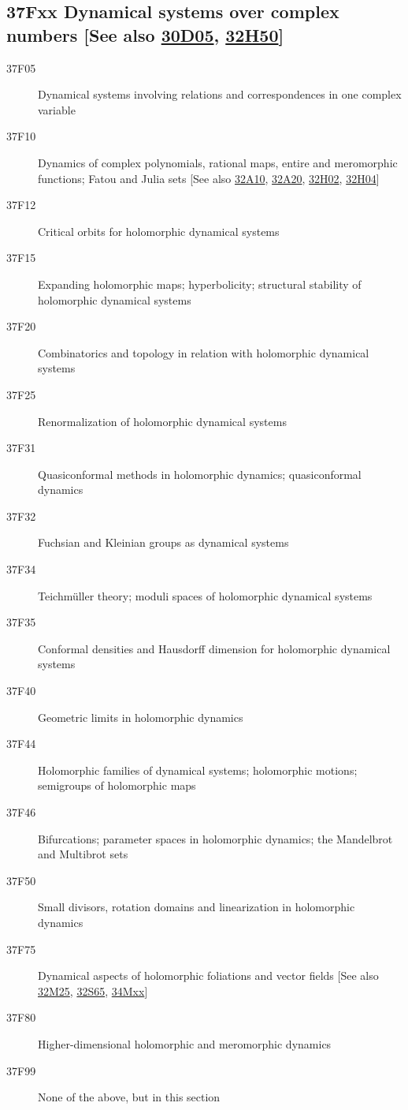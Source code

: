 \subsection*{37Fxx  Dynamical systems over complex numbers [See also \hyperref[30D05]{30D05}, \hyperref[32H50]{32H50}] }\label{37Fxx}
\begin{description} 
\item [37F05]\label{37F05} Dynamical systems involving relations and correspondences in one complex variable 
\item [37F10]\label{37F10}  Dynamics of complex polynomials, rational maps, entire and meromorphic functions; Fatou and Julia sets [See also \hyperref[32A10]{32A10}, \hyperref[32A20]{32A20}, \hyperref[32H02]{32H02}, \hyperref[32H04]{32H04}]
\item [37F12]\label{37F12} Critical orbits for holomorphic dynamical systems
\item [37F15]\label{37F15} Expanding holomorphic maps; hyperbolicity;  structural stability of holomorphic dynamical systems
\item [37F20]\label{37F20} Combinatorics and topology in relation with holomorphic dynamical systems
\item [37F25]\label{37F25} Renormalization of holomorphic dynamical systems
\item [37F31]\label{37F31} Quasiconformal methods in holomorphic dynamics; quasiconformal dynamics
\item [37F32]\label{37F32} Fuchsian and Kleinian groups as dynamical systems 
\item [37F34]\label{37F34} Teichm\"{u}ller theory; moduli spaces of holomorphic dynamical systems
\item [37F35]\label{37F35} Conformal densities and Hausdorff dimension for holomorphic dynamical systems
\item [37F40]\label{37F40} Geometric limits in holomorphic dynamics
\item [37F44]\label{37F44} Holomorphic families of dynamical systems; holomorphic motions; semigroups of holomorphic maps
\item [37F46]\label{37F46} Bifurcations; parameter spaces in holomorphic dynamics; the Mandelbrot and Multibrot sets 
\item [37F50]\label{37F50} Small divisors, rotation domains and linearization in holomorphic dynamics  
\item [37F75]\label{37F75} Dynamical aspects of holomorphic foliations and vector fields  [See also \hyperref[32M25]{32M25}, \hyperref[32S65]{32S65}, \hyperref[34Mxx]{34Mxx}]
\item [37F80]\label{37F80} Higher-dimensional holomorphic and meromorphic dynamics
\item [37F99]\label{37F99} None of the above, but in this section
\end{description}

